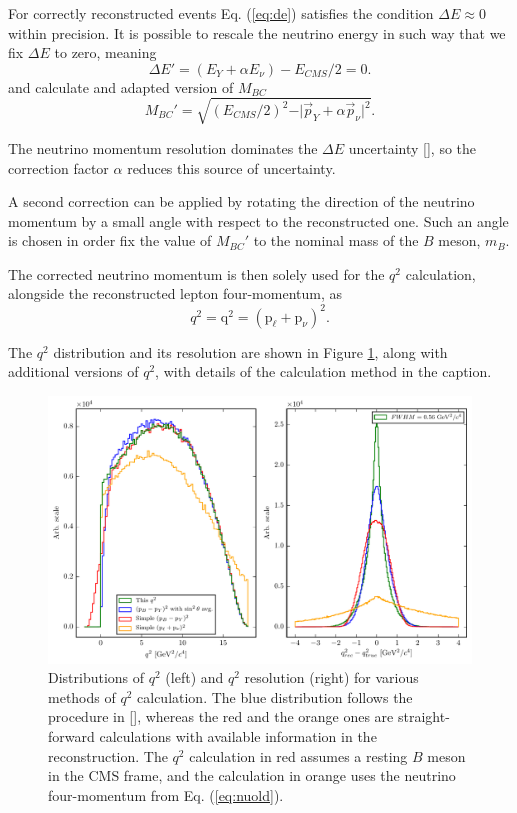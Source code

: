 \documentclass[oneside,a4paper,openany,12pt]{scrbook}
\begin{document}
For correctly reconstructed events Eq. (\ref{eq:de}) satisfies the condition $\Delta E \approx 0$ within precision. It is possible to rescale the neutrino energy in such way that we fix $\Delta E$ to zero, meaning 
\begin{equation}
\Delta E' = (E_Y + \alpha E_\nu) - E_{CMS}/2 = 0.
\end{equation}
and calculate and adapted version of $M_{BC}$
\begin{equation}
M_{BC}' = \sqrt{\left(E_{CMS}/2\right)^2 - \vert \vec{p}_Y + \alpha \vec{p}_\nu \vert^2}.
\end{equation}

The neutrino momentum resolution dominates the $\Delta E$ uncertainty [], so the correction factor $\alpha$ reduces this source of uncertainty.

A second correction can be applied by rotating the direction of the neutrino momentum by a small angle with respect to the reconstructed one. Such an angle is chosen in order fix the value of $M_{BC}'$ to the nominal mass of the $B$ meson, $m_B$.

The corrected neutrino momentum is then solely used for the $q^2$ calculation, alongside the reconstructed lepton four-momentum, as
\begin{equation}
\label{eq:q2}
q^2 = \mathrm{q}^2 = \left(\mathrm{p}_\ell + \mathrm{p}_\nu \right)^2.
\end{equation}

The $q^2$ distribution and its resolution are shown in Figure \ref{fig:q2}, along with additional versions of $q^2$, with details of the calculation method in the caption.
\begin{figure}[H]
\centering
\captionsetup{width=0.8\linewidth}
\includegraphics[width=\linewidth]{fig/q2}
\caption{Distributions of $q^2$ (left) and $q^2$ resolution (right) for various methods of $q^2$ calculation. The blue distribution follows the procedure in [], whereas the red and the orange ones are straight-forward calculations with available information in the reconstruction. The $q^2$ calculation in red assumes a resting $B$ meson in the CMS frame, and the calculation in orange uses the neutrino four-momentum from Eq. (\ref{eq:nuold}).}
\label{fig:q2}
\end{figure}
\end{document}

